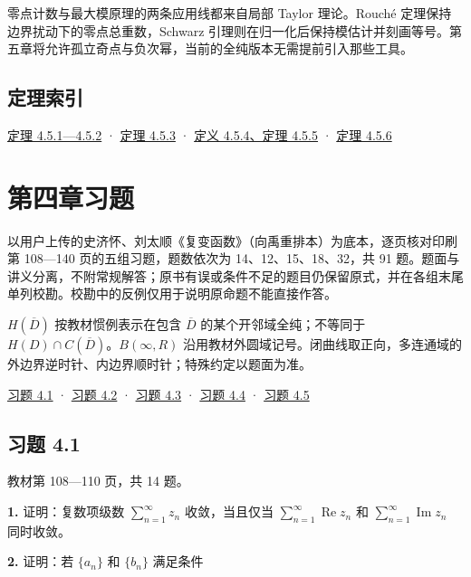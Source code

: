 \documentclass[11pt,a4paper]{article}
\begin{document}
零点计数与最大模原理的两条应用线都来自局部 Taylor 理论。Rouché
定理保持边界扰动下的零点总重数，Schwarz
引理则在归一化后保持模估计并刻画等号。第五章将允许孤立奇点与负次幂，当前的全纯版本无需提前引入那些工具。

\subsection{定理索引}\label{ch04-s5-heading-6}

\hyperref[ch04-s5-heading-1]{定理 4.5.1---4.5.2} · \hyperref[ch04-s5-heading-2]{定理
4.5.3} · \hyperref[ch04-s5-heading-3]{定义 4.5.4、定理 4.5.5} ·
\hyperref[ch04-s5-heading-4]{定理 4.5.6}

\clearpage\section*{第四章习题}
以用户上传的史济怀、刘太顺《复变函数》（向禹重排本）为底本，逐页核对印刷第
108---140 页的五组习题，题数依次为 14、12、15、18、32，共 91
题。题面与讲义分离，不附常规解答；原书有误或条件不足的题目仍保留原式，并在各组末尾单列校勘。校勘中的反例仅用于说明原命题不能直接作答。

\(H(\overline D)\) 按教材惯例表示在包含 \(\overline D\)
的某个开邻域全纯；不等同于 \(H(D)\cap C(\overline D)\)。\(B(\infty,R)\)
沿用教材外圆域记号。闭曲线取正向，多连通域的外边界逆时针、内边界顺时针；特殊约定以题面为准。

\hyperref[ch04-practice-heading-1]{习题 4.1} · \hyperref[ch04-practice-heading-2]{习题 4.2} ·
\hyperref[ch04-practice-heading-3]{习题 4.3} · \hyperref[ch04-practice-heading-4]{习题 4.4} ·
\hyperref[ch04-practice-heading-5]{习题 4.5}

\subsection{习题 4.1}\label{ch04-practice-heading-1}

教材第 108---110 页，共 14 题。

\par{}
\noindent\textbf{1.} 证明：复数项级数 \(\sum_{n=1}^{\infty}z_n\) 收敛，当且仅当
\(\sum_{n=1}^{\infty}\operatorname{Re}z_n\) 和
\(\sum_{n=1}^{\infty}\operatorname{Im}z_n\) 同时收敛。

\par{}
\noindent\textbf{2.} 证明：若 \(\{a_n\}\) 和 \(\{b_n\}\) 满足条件
\end{document}
